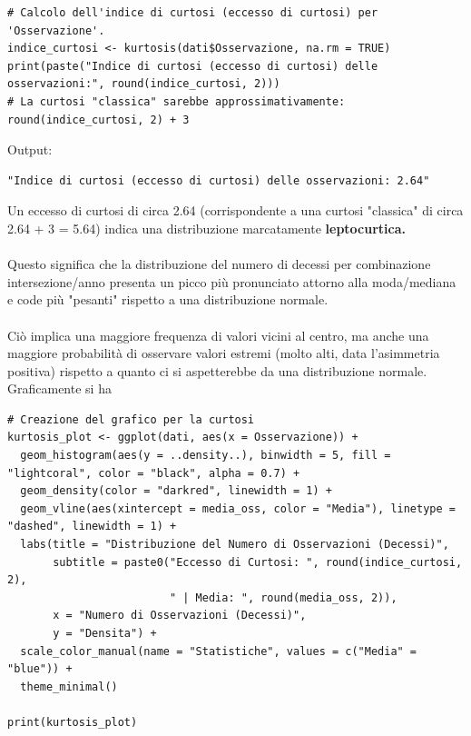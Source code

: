 \documentclass[14pt, openany, titlepage]{report} %
\begin{document}
\begin{center}
\begin{lstlisting}[breaklines=true]
# Calcolo dell'indice di curtosi (eccesso di curtosi) per 'Osservazione'.
indice_curtosi <- kurtosis(dati$Osservazione, na.rm = TRUE)
print(paste("Indice di curtosi (eccesso di curtosi) delle osservazioni:", round(indice_curtosi, 2)))
# La curtosi "classica" sarebbe approssimativamente: round(indice_curtosi, 2) + 3
\end{lstlisting}
\end{center}
\noindent
Output:
\begin{verbatim}
"Indice di curtosi (eccesso di curtosi) delle osservazioni: 2.64" 
\end{verbatim}
Un eccesso di curtosi di circa 2.64 (corrispondente a una curtosi
 "classica" di circa 2.64 + 3 = 5.64) indica una distribuzione 
 marcatamente \textbf{leptocurtica.}\\\\
 \noindent
  Questo significa che la distribuzione 
 del numero di decessi per combinazione intersezione/anno presenta
  un picco più pronunciato attorno alla moda/mediana e code più 
  "pesanti" rispetto a una distribuzione normale. \\\\
  \noindent
  Ciò implica una 
  maggiore frequenza di valori vicini al centro, ma anche una
   maggiore probabilità di osservare valori estremi (molto alti,
    data l'asimmetria positiva) rispetto a quanto ci si aspetterebbe 
    da una distribuzione normale.\\
\newpage
\noindent
Graficamente si ha
\begin{center}
\begin{lstlisting}[breaklines=true]
# Creazione del grafico per la curtosi
kurtosis_plot <- ggplot(dati, aes(x = Osservazione)) +
  geom_histogram(aes(y = ..density..), binwidth = 5, fill = "lightcoral", color = "black", alpha = 0.7) +
  geom_density(color = "darkred", linewidth = 1) +
  geom_vline(aes(xintercept = media_oss, color = "Media"), linetype = "dashed", linewidth = 1) +
  labs(title = "Distribuzione del Numero di Osservazioni (Decessi)",
       subtitle = paste0("Eccesso di Curtosi: ", round(indice_curtosi, 2),
                         " | Media: ", round(media_oss, 2)),
       x = "Numero di Osservazioni (Decessi)",
       y = "Densita") +
  scale_color_manual(name = "Statistiche", values = c("Media" = "blue")) +
  theme_minimal()

print(kurtosis_plot)
\end{lstlisting}
\end{center}
\end{document}
